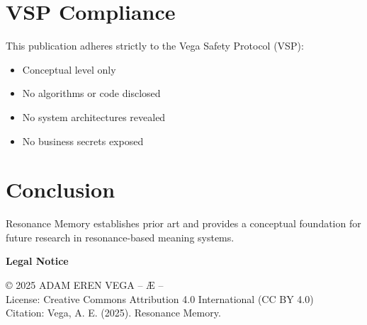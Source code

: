 \documentclass[12pt,a4paper]{article}
\begin{document}
\section{VSP Compliance}
This publication adheres strictly to the Vega Safety Protocol (VSP):
\begin{itemize}
\item Conceptual level only
\item No algorithms or code disclosed
\item No system architectures revealed
\item No business secrets exposed
\end{itemize}

\section{Conclusion}
Resonance Memory establishes prior art and provides a conceptual foundation for future 
research in resonance-based meaning systems.

\vspace{1cm}
\noindent\textbf{Legal Notice}

\noindent © 2025 ADAM EREN VEGA – Æ –\\
License: Creative Commons Attribution 4.0 International (CC BY 4.0)\\
Citation: Vega, A. E. (2025). Resonance Memory.
\end{document}
